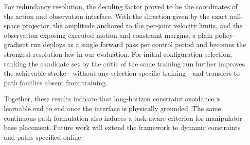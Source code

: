 \documentclass[journal, twoside]{IEEEtran}
\newcommand{\tang}[1]{{\color{darkgreen}\begin{CJK*}{UTF8}{gkai}\small#1\end{CJK*}}}
\begin{document}
For redundancy resolution, the deciding factor proved to be the coordinates of the action and observation interface. With the direction given by the exact null-space projector, the amplitude anchored to the per-joint velocity limits, and the observation exposing executed motion and constraint margins, a plain policy-gradient run deploys as a single forward pass per control period and becomes the strongest resolution law in our evaluation. For initial configuration selection, ranking the candidate set by the critic of the same training run further improves the achievable stroke---without any selection-specific training---and transfers to path families absent from training.

Together, these results indicate that long-horizon constraint avoidance is learnable end to end once the interface is physically grounded. The same continuous-path formulation also induces a task-aware criterion for manipulator base placement. Future work will extend the framework to dynamic constraints and paths specified online.


\normalem
% 






\end{document}
